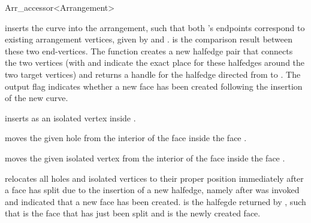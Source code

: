 \begin{ccRefClass}{Arr_accessor<Arrangement>}
\begin{ccAdvanced}
  {inserts the curve  into the arrangement, such that both 's
   endpoints correspond to existing arrangement vertices, given by
    and .  is the comparison
   result between these two end-vertices. The function creates a
   new halfedge pair that connects the two vertices (with  and
    indicate the exact place for these halfedges around the two
   target vertices) and returns a handle for the halfedge directed from
    to .
   The output flag  indicates whether a new face has been created
   following the insertion of the new curve.
   }

    {inserts  as an isolated vertex inside .
     }

    {moves the given hole from the interior of the face  inside the
     face .
     }

    {moves the given isolated vertex from the interior of the face 
     inside the face .
     }

    {relocates all holes and isolated vertices to their proper position
     immediately after a face has split due to the insertion of a new halfedge,
     namely after  was invoked and indicated that
     a new face has been created.  is the halfegde returned by
     ,
     such that  is the face that has just been split and
      is the newly created face.}


\end{ccAdvanced}
\end{ccRefClass}
